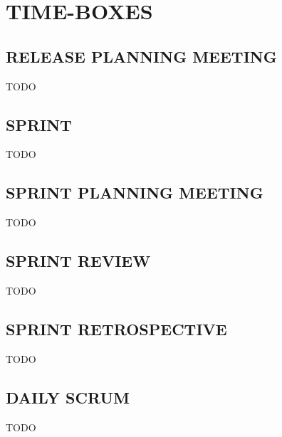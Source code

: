 \newpage
\section*{TIME-BOXES}
\label{sec:timeboxes}

\subsection*{RELEASE PLANNING MEETING}
\label{sec:releaseplanningmeeting}
TODO

\subsection*{SPRINT}
\label{sec:sprint}
TODO

\subsection*{SPRINT PLANNING MEETING}
\label{sec:sprintplannnigmeeting}
TODO

\subsection*{SPRINT REVIEW}
\label{sec:sprintreview}
TODO

\subsection*{SPRINT RETROSPECTIVE}
\label{sec:sprintretrospective}
TODO

\subsection*{DAILY SCRUM}
\label{sec:dailyscrum}
TODO